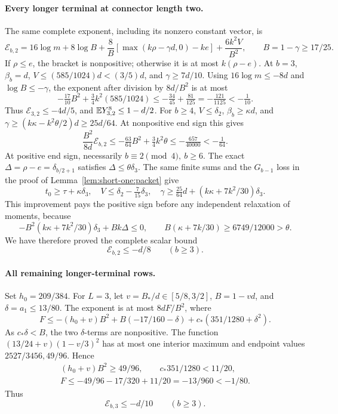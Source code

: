 \paragraph{Every longer terminal at connector length two.}
The same complete exponent, including its nonzero constant vector,
is
\[
 \mathcal E_{b,2}=16\log m+8\log B
 +\frac8B[\max(k\rho-\gamma d,0)-ke]+\frac{6k^2V}{B^2},
 \qquad B=1-\gamma\ge17/25.
\]
If \(\rho\le e\), the bracket is nonpositive; otherwise it is at most
\(k(\rho-e)\). At \(b=3\), \(\beta_b=d\),
\(V\le(585/1024)d<(3/5)d\), and \(\gamma\ge7d/10\).
Using \(16\log m\le-8d\) and \(\log B\le-\gamma\), the exponent
after division by \(8d/B^2\) is at most
\[
 -\tfrac{17}{10}B^2+\tfrac34k^2(585/1024)
 \le-\tfrac{34}{45}+\tfrac{81}{125}
 =-\tfrac{121}{1125}<-\tfrac1{10}.
\]
Thus \(\mathcal E_{3,2}\le-4d/5\), and
\(\mathbb E Y_{3,2}^8\le1-d/2\).
For \(b\ge4\), \(V\le\delta_2\), \(\beta_b\ge\kappa d\), and
\(\gamma\ge(k\kappa-k^2\theta/2)d\ge25d/64\).
At nonpositive end sign this gives
\[
 \frac{B^2}{8d}\mathcal E_{b,2}
 \le-\tfrac{63}{64}B^2+\tfrac34k^2\theta
 \le-\tfrac{657}{40000}<-\tfrac1{64}.
\]
At positive end sign, necessarily \(b\equiv2\pmod4,\ b\ge6\).
The exact \(\Delta=\rho-e=\delta_{b/2+1}\) satisfies
\(\Delta\le\theta\delta_3\). The same finite sums and the
\(G_{b-1}\) loss in the proof of Lemma~\ref{lem:short-one:packet}
give
\[
 t_0\ge\tau+\kappa\delta_3,\quad
 V\le\delta_2-\tfrac7{15}\delta_3,\quad
 \gamma\ge\tfrac{25}{64}d+(k\kappa+7k^2/30)\delta_3 .
\]
This improvement pays the positive sign before any independent
relaxation of moments, because
\[
 -B^2(k\kappa+7k^2/30)\delta_3+Bk\Delta\le0,\qquad
 B(\kappa+7k/30)\ge6749/12000>\theta .
\]
We have therefore proved the complete scalar bound
\begin{equation}\label{eq:short2:longer-L2-paid}
 \mathcal E_{b,2}\le-d/8\qquad(b\ge3).
\end{equation}

\paragraph{All remaining longer-terminal rows.}
Set \(h_0=209/384\).
For \(L=3\), let \(v=B_*/d\in[5/8,3/2]\),
\(B=1-vd\), and \(\delta=a_1\le13/80\).
The exponent is at most \(8dF/B^2\), where
\[
 F\le-(h_0+v)B^2+B(-17/160-\delta)
           +c_*(351/1280+\delta^2).
\]
As \(c_*\delta<B\), the two \(\delta\)-terms are nonpositive.
The function \((13/24+v)(1-v/3)^2\) has at most one interior
maximum and endpoint values \(2527/3456,49/96\). Hence
\[
\begin{gathered}
 (h_0+v)B^2\ge49/96,\qquad c_*351/1280<11/20,\\
 F\le-49/96-17/320+11/20=-13/960<-1/80.
\end{gathered}
\]
Thus
\begin{equation}\label{eq:short2:longer-L3-paid}
 \mathcal E_{b,3}\le-d/10\qquad(b\ge3).
\end{equation}

